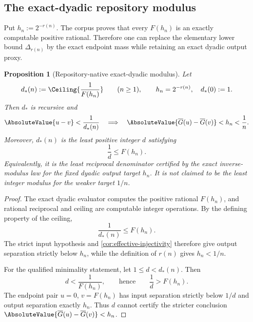 \documentclass[11pt,oneside]{article}
\newtheorem{proposition}[theorem]{Proposition}
\theoremstyle{definition}
\theoremstyle{remark}
\numberwithin{equation}{section}
\newcommand{\InvT}{\overline G}
\begin{document}
\subsection{The exact-dyadic repository modulus}

Put $h_n:=2^{-r(n)}$.  The corpus proves that every $F(h_n)$ is an exactly
computable positive rational.  Therefore one can replace the elementary lower
bound $\Delta_{r(n)}$ by the exact endpoint mass while retaining an exact
dyadic output proxy.

\begin{proposition}[Repository-native exact-dyadic modulus]\label{prop:exact-dyadic-modulus}
Let
\begin{equation}\label{eq:d-star}
 d_*(n):=
 \Ceiling{\frac{1}{F(h_n)}}
 \qquad(n\ge1),
 \qquad h_n=2^{-r(n)},
 \quad d_*(0):=1.
\end{equation}
Then $d_*$ is recursive and
\begin{equation}\label{eq:d-star-strong}
 \AbsoluteValue{u-v}<\frac1{d_*(n)}
 \quad\Longrightarrow\quad
 \AbsoluteValue{\InvT(u)-\InvT(v)}<h_n<\frac1n.
\end{equation}
Moreover, $d_*(n)$ is the least positive integer $d$ satisfying
\[
 \frac1d\le F(h_n).
\]
Equivalently, it is the least reciprocal denominator certified by the exact
inverse-modulus law for the fixed dyadic output target $h_n$.  It is not
claimed to be the least integer modulus for the weaker target $1/n$.
\end{proposition}

\begin{proof}
The exact dyadic evaluator computes the positive rational $F(h_n)$, and
rational reciprocal and ceiling are computable integer operations.  By the
defining property of the ceiling,
\[
 \frac1{d_*(n)}\le F(h_n).
\]
The strict input hypothesis and \cref{cor:effective-injectivity} therefore
give output separation strictly below $h_n$, while the definition of $r(n)$
gives $h_n<1/n$.

For the qualified minimality statement, let $1\le d<d_*(n)$.  Then
\[
 d<\frac1{F(h_n)},
 \qquad\text{hence}\qquad
 \frac1d>F(h_n).
\]
The endpoint pair $u=0$, $v=F(h_n)$ has input separation strictly below
$1/d$ and output separation exactly $h_n$.  Thus $d$ cannot certify the
stricter conclusion $\AbsoluteValue{\InvT(u)-\InvT(v)}<h_n$.
\end{proof}
\end{document}
